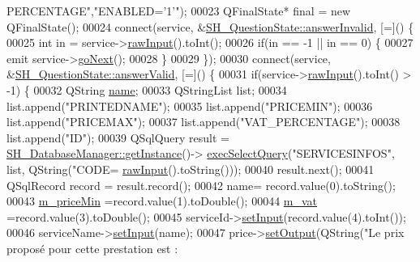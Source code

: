 \begin{DoxyCode}
{      PERCENTAGE"},\textcolor{stringliteral}{"ENABLED='1'"});
00023     QFinalState* \textcolor{keyword}{final} = \textcolor{keyword}{new} QFinalState();
00024     connect(service, &\hyperlink{classSH__QuestionState_a3348a8a683130678ac87a10ba2a25486}{SH\_QuestionState::answerInvalid}, [=]() \{
00025         \textcolor{keywordtype}{int} in = service->\hyperlink{classSH__DatabaseContentQuestionState_a344d9109e15509506b1b998d28392cac}{rawInput}().toInt();
00026         \textcolor{keywordflow}{if}(in == -1 || in == 0) \{
00027             emit service->\hyperlink{classSH__GenericState_a34c1bebc765cc3a62d66c94c37d4f0c3}{goNext}();
00028         \}
00029     \});
00030     connect(service, &\hyperlink{classSH__QuestionState_a04e259643788d15ab6244bc8a04286d6}{SH\_QuestionState::answerValid}, [=]() \{
00031         \textcolor{keywordflow}{if}(service->\hyperlink{classSH__DatabaseContentQuestionState_a344d9109e15509506b1b998d28392cac}{rawInput}().toInt() > -1) \{
00032             QString \hyperlink{classSH__NamedObject_a9f686c6f2a5bcc08ad03d0cee0151f0f}{name};
00033             QStringList list;
00034             list.append(\textcolor{stringliteral}{"PRINTEDNAME"});
00035             list.append(\textcolor{stringliteral}{"PRICEMIN"});
00036             list.append(\textcolor{stringliteral}{"PRICEMAX"});
00037             list.append(\textcolor{stringliteral}{"VAT\_PERCENTAGE"});
00038             list.append(\textcolor{stringliteral}{"ID"});
00039             QSqlQuery result = \hyperlink{classSH__DatabaseManager_a31198eb4de0f8b18e3fa0eed09f24d19}{SH\_DatabaseManager::getInstance}()->
      \hyperlink{classSH__DatabaseManager_ab8f9850cb68444ab9a4e613b36a3b044}{execSelectQuery}(\textcolor{stringliteral}{"SERVICESINFOS"}, list, QString(\textcolor{stringliteral}{"CODE=%
      \hyperlink{classSH__DatabaseContentQuestionState_a344d9109e15509506b1b998d28392cac}{rawInput}().toString()));
00040             result.next();
00041             QSqlRecord record = result.record();
00042             name= record.value(0).toString();
00043             \hyperlink{classSH__ServiceCharging_a44584a7ff1edd6ae03c4f77544136c13}{m\_priceMin} =record.value(1).toDouble();
00044             \hyperlink{classSH__ServiceCharging_ae2fa75c56883dc4af6b0bbcbb86d0861}{m\_vat} =record.value(3).toDouble();
00045             serviceId->\hyperlink{classSH__InOutState_aaec9c2b5ef7c406bff7469461352d47c}{setInput}(record.value(4).toInt());
00046             serviceName->\hyperlink{classSH__QuestionState_ab40b6202090d1afcc965e124b2deb88a}{setInput}(name);
00047             price->\hyperlink{classSH__InOutState_af611c84134e262739cd834797b315c80}{setOutput}(QString(\textcolor{stringliteral}{"Le prix proposé pour cette prestation est : %
}}
\end{DoxyCode}
